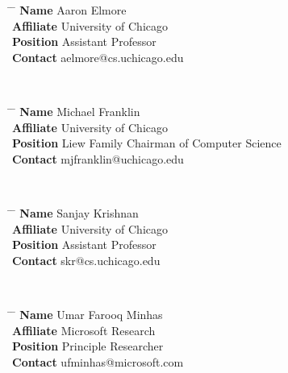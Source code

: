 \documentclass[10pt]{article} %
\begin{document}
\parbox{0.5\textwidth}{ %
\begin{tabbing}
\hspace{1.5cm} \= \hspace{4cm} \= \kill %
{\bf Name} \> Aaron Elmore \\ %
{\bf Affiliate} \> University of Chicago \\ %
{\bf Position} \> Assistant Professor \\ %
{\bf Contact} \> aelmore@cs.uchicago.edu %
\end{tabbing}}
\\
\parbox{0.5\textwidth}{ %
\begin{tabbing}
\hspace{1.5cm} \= \hspace{4cm} \= \kill %
{\bf Name} \> Michael Franklin \\ %
{\bf Affiliate} \> University of Chicago \\ %
{\bf Position} \> Liew Family Chairman of Computer Science \\ %
{\bf Contact} \> mjfranklin@uchicago.edu %
\end{tabbing}}
\\
\parbox{0.5\textwidth}{ %
\begin{tabbing}
\hspace{1.5cm} \= \hspace{4cm} \= \kill %
{\bf Name} \> Sanjay Krishnan \\ %
{\bf Affiliate} \> University of Chicago \\ %
{\bf Position} \> Assistant Professor \\ %
{\bf Contact} \> skr@cs.uchicago.edu %
\end{tabbing}}
\\
\parbox{0.5\textwidth}{ %
\begin{tabbing}
\hspace{1.5cm} \= \hspace{4cm} \= \kill %
{\bf Name} \> Umar Farooq Minhas \\ %
{\bf Affiliate} \> Microsoft Research \\ %
{\bf Position} \> Principle Researcher \\ %
{\bf Contact} \> ufminhas@microsoft.com %
\end{tabbing}}
\end{document}

